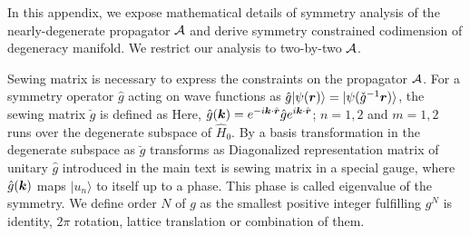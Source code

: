 \documentclass[aps, prb, showpacs, twocolumn, notitlepage, superscriptaddress]{revtex4-1}
\begin{document}
In this appendix, we expose mathematical details of symmetry analysis of the nearly-degenerate propagator ${\cal A}$ and derive symmetry constrained codimension of degeneracy manifold. We restrict our analysis to two-by-two ${\cal A}$.


Sewing matrix is necessary to express the constraints on the propagator ${\cal A}$. For a symmetry operator $\hat{g}$ acting on wave functions as $\hat{g}|\psi(\boldsymbol{r})\rangle=|\psi(\check{g}^{-1}\boldsymbol{r})\rangle$, the sewing matrix $\breve{g}$ is defined as 
Here, $\hat{g}(\boldsymbol{k})=e^{-i\boldsymbol{k}\cdot\hat{\boldsymbol{r}}}\hat{g}e^{i\boldsymbol{k}\cdot\hat{\boldsymbol{r}}}$; $n=1,2$ and $m=1,2$ runs over the degenerate subspace of $\hat{H}_0$. By a basis transformation in the degenerate subspace as 
$\breve{g}$ transforms as
Diagonalized representation matrix of unitary $\hat{g}$ introduced in the main text is sewing matrix in a special gauge, where $\hat{g}(\boldsymbol{k})$ maps $|u_n\rangle$ to itself up to a phase. This phase is called eigenvalue of the symmetry. We define order $N$ of $g$ as the smallest positive integer fulfilling $g^N$ is identity, $2\pi$ rotation, lattice translation or combination of them.
\end{document}
